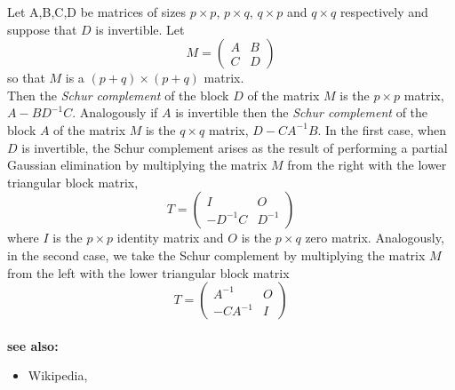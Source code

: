 \documentclass[12pt]{article}
\begin{document}
Let A,B,C,D be matrices of sizes $p\times p$, $p\times q$, $q\times p$ and $q\times q$ respectively and suppose that $D$ is invertible. Let 
$$M=\begin{pmatrix} A & B \\ C & D \end{pmatrix}$$
so that $M$ is a $(p+q)\times(p+q)$ matrix.
\\Then the \emph{Schur complement} of the block $D$ of the matrix $M$ is the 
$p\times p$ matrix, $A-BD^{-1}C$. Analogously if $A$ is invertible then the \emph{Schur complement} of the block $A$ of the matrix $M$ is the 
$q\times q$ matrix, $D-CA^{-1}B$.
In the first case, when  $D$ is invertible, the Schur complement arises as the result of performing a partial Gaussian elimination by multiplying the matrix $M$ from the right with the lower triangular block matrix,
$$T=\begin{pmatrix} I & O \\ -D^{-1}C & D^{-1} \end{pmatrix}$$ 
where $I$ is the $p\times p$ identity matrix and $O$ is the $p\times q$ zero matrix. Analogously, in the second case, we take the Schur complement by multiplying the matrix $M$ from the left with the lower triangular block matrix 
$$T=\begin{pmatrix} A^{-1} & O \\ -CA^{-1} & I \end{pmatrix}$$ 
\\\textbf{see also:}
\begin{itemize}
\item Wikipedia, 
\end{itemize}
\end{document}
